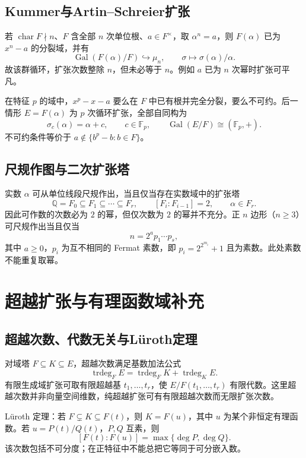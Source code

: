 \documentclass[../main.tex]{subfiles}
\begin{document}
\subsection{Kummer与Artin--Schreier扩张}
若 $\operatorname{char}F\nmid n$、$F$ 含全部 $n$ 次单位根、$a\in F^\times$，取 $\alpha^n=a$，则 $F(\alpha)$ 已为 $x^n-a$ 的分裂域，并有
\[
\operatorname{Gal}(F(\alpha)/F)\hookrightarrow\mu_n,\qquad
\sigma\longmapsto\sigma(\alpha)/\alpha.
\]
故该群循环，扩张次数整除 $n$，但未必等于 $n$。例如 $a$ 已为 $n$ 次幂时扩张可平凡。

在特征 $p$ 的域中，$x^p-x-a$ 要么在 $F$ 中已有根并完全分裂，要么不可约。后一情形 $E=F(\alpha)$ 为 $p$ 次循环扩张，全部自同构为
\[
\sigma_c(\alpha)=\alpha+c,\qquad c\in\mathbb F_p,
\qquad \operatorname{Gal}(E/F)\cong(\mathbb F_p,+).
\]
不可约条件等价于 $a\notin\{b^p-b:b\in F\}$。

\subsection{尺规作图与二次扩张塔}
实数 $\alpha$ 可从单位线段尺规作出，当且仅当存在实数域中的扩张塔
\[
\mathbb Q=F_0\subseteq F_1\subseteq\cdots\subseteq F_r,\qquad
[F_i:F_{i-1}]=2,\qquad\alpha\in F_r.
\]
因此可作数的次数必为 $2$ 的幂，但仅次数为 $2$ 的幂并不充分。正 $n$ 边形（$n\ge3$）可尺规作出当且仅当
\[
n=2^ap_1\cdots p_s,
\]
其中 $a\ge0$，$p_i$ 为互不相同的 Fermat 素数，即 $p_i=2^{2^{m_i}}+1$ 且为素数。此处素数不能重复取幂。

\section{超越扩张与有理函数域补充}
\subsection{超越次数、代数无关与Lüroth定理}
对域塔 $F\subseteq K\subseteq E$，超越次数满足基数加法公式
\[
\operatorname{trdeg}_F E=\operatorname{trdeg}_F K+\operatorname{trdeg}_K E.
\]
有限生成域扩张可取有限超越基 $t_1,\ldots,t_r$，使 $E/F(t_1,\ldots,t_r)$ 有限代数。这里超越次数并非向量空间维数，纯超越扩张可有有限超越次数而无限扩张次数。

Lüroth 定理：若 $F\subsetneq K\subseteq F(t)$，则 $K=F(u)$，其中 $u$ 为某个非恒定有理函数。若 $u=P(t)/Q(t)$，$P,Q$ 互素，则
\[
[F(t):F(u)]=\max\{\deg P,\deg Q\}.
\]
该次数包括不可分度；在正特征中不能总把它等同于可分嵌入数。
\end{document}

